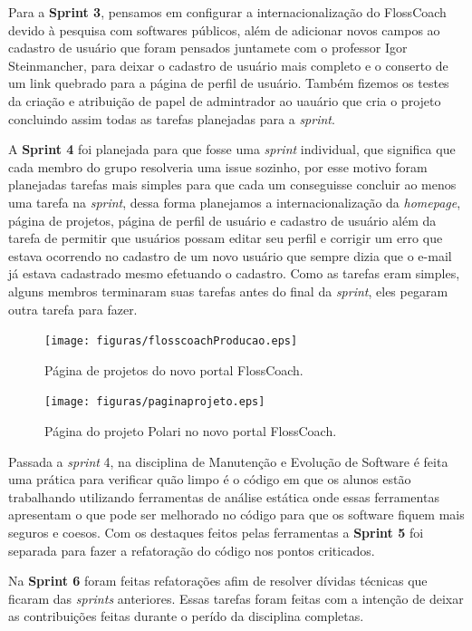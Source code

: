 Para a \textbf{Sprint 3}, pensamos em configurar a internacionalização do FlossCoach
devido à pesquisa com softwares públicos, além de adicionar novos campos ao cadastro 
de usuário que foram pensados juntamete com o professor Igor Steinmancher, para deixar o cadastro de usuário 
mais completo e o conserto de um link quebrado para a página de perfil de usuário.
Também fizemos os testes da criação e atribuição de papel de admintrador ao uauário
que cria o projeto concluindo assim todas as tarefas planejadas para a \textit{sprint}.

A \textbf{Sprint 4} foi planejada para que fosse uma \textit{sprint} individual, que
significa que cada membro do grupo resolveria uma issue sozinho, por esse motivo foram 
planejadas tarefas mais simples para que cada um conseguisse concluir ao menos uma
tarefa na \textit{sprint}, dessa forma planejamos a internacionalização da \textit{homepage},
página de projetos, página de perfil de usuário e cadastro de usuário além da 
tarefa de permitir que usuários possam editar seu perfil e corrigir um erro que
estava ocorrendo no cadastro de um novo usuário que sempre dizia que o e-mail já
estava cadastrado mesmo efetuando o  cadastro. Como as tarefas eram simples,
alguns membros terminaram suas tarefas antes do final da \textit{sprint}, eles 
pegaram outra tarefa para fazer.

\begin{figure}[h]
	\centering
	\label{fig:producao}
		\texttt{[image: figuras/flosscoachProducao.eps]}
	\caption{Página de projetos do novo portal FlossCoach.}
\end{figure}

\begin{figure}[h]
	\centering
	\label{fig:producao}
		\texttt{[image: figuras/paginaprojeto.eps]}
	\caption{Página do projeto Polari no novo portal FlossCoach.}
\end{figure}

Passada a \textit{sprint} 4, na disciplina de Manutenção e Evolução de Software é feita uma prática
para verificar quão limpo é o código em que os alunos estão trabalhando utilizando
ferramentas de análise estática onde essas ferramentas apresentam o que pode ser melhorado 
no código para que os software fiquem mais seguros e coesos. Com os destaques feitos pelas
ferramentas a \textbf{Sprint 5} foi separada para fazer a refatoração do código
nos pontos criticados.

Na \textbf{Sprint 6} foram feitas refatorações afim de resolver dívidas técnicas 
que ficaram das \textit{sprints} anteriores. Essas tarefas foram feitas com a intenção 
de deixar as contribuições feitas durante o perído da disciplina completas.  


